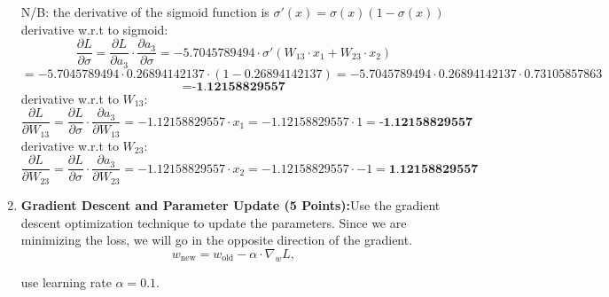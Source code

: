 \documentclass{article}
\begin{document}
\begin{enumerate}
\[    \]
    N/B: the derivative of the sigmoid function is $\sigma'(x) = \sigma(x)(1 - \sigma(x))$
    \\ derivative w.r.t to sigmoid:
    \[
    \frac{\partial L}{\partial \sigma} = \frac{\partial L}{\partial a_3} \cdot \frac{\partial a_3}{\partial \sigma} = -5.7045789494 \cdot \sigma'(W_{13} \cdot x_1 + W_{23} \cdot x_2)
    \]
    \[
    = -5.7045789494 \cdot 0.26894142137 \cdot (1 - 0.26894142137) = -5.7045789494 \cdot 0.26894142137 \cdot 0.73105857863
    \]
    \[
        = \textbf{-1.12158829557}
    \]
    derivative w.r.t to $W_{13}$:
    \[
    \frac{\partial L}{\partial W_{13}} = \frac{\partial L}{\partial \sigma} \cdot \frac{\partial a_3}{\partial W_{13}} = -1.12158829557 \cdot x_1 = -1.12158829557 \cdot 1 = \textbf{-1.12158829557}
    \]
    derivative w.r.t to $W_{23}$:
    \[
    \frac{\partial L}{\partial W_{23}} = \frac{\partial L}{\partial \sigma} \cdot \frac{\partial a_3}{\partial W_{23}} = -1.12158829557 \cdot x_2 = -1.12158829557 \cdot -1 = \textbf{1.12158829557}
    \]
\item \textbf{Gradient Descent and Parameter Update (5 Points):}Use the gradient descent optimization
technique to update the parameters. Since we are minimizing the loss, we will go in the opposite
direction of the gradient.
    \[
    w_{\text{new}} = w_{\text{old}} - \alpha \cdot \nabla_w L,
    \]
    
    use learning rate $\alpha = 0.1$. 
    

\end{enumerate}
\end{document}
